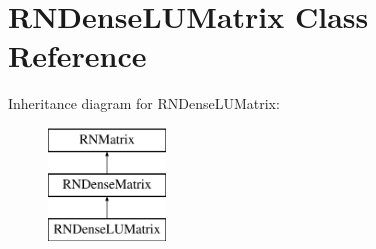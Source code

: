 \hypertarget{class_r_n_dense_l_u_matrix}{}\section{R\+N\+Dense\+L\+U\+Matrix Class Reference}
\label{class_r_n_dense_l_u_matrix}
Inheritance diagram for R\+N\+Dense\+L\+U\+Matrix\+:\begin{figure}[H]
\begin{center}
\leavevmode
\includegraphics[height=3.000000cm]{class_r_n_dense_l_u_matrix}
\end{center}
\end{figure}
